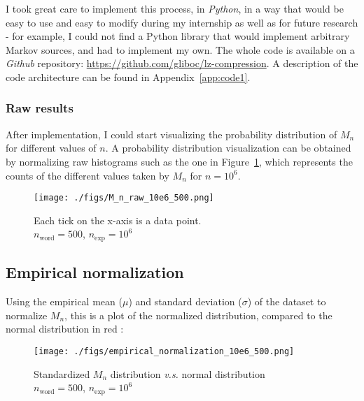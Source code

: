 	I took great care to implement this process, in \emph{Python}, 
	in a way that would be easy to use and easy to modify during my 
	internship as well as for future research - for example, I 
	could not find a Python library that would implement arbitrary Markov 
	sources, and had to implement my own.
	The whole code is available on a \emph{Github} repository:
	{\color{gray} \url{https://github.com/gliboc/lz-compression}}.
	A description of the code architecture can be found in Appendix~\ref{app:code1}.

	\subsubsection{ Raw results }
	
After implementation, I could start visualizing the probability
distribution of $M_n$ for different values of $n$. A probability 
distribution visualization can be obtained by normalizing raw 
histograms such as the one in Figure~\ref{fig:rawhisto}, which represents the counts of 
the different values taken by $M_n$ for $n=10^6$. 


 \begin{figure}[H]
	\centering
	   \texttt{[image: ./figs/M\_n\_raw\_10e6\_500.png]}	
		\caption{Each tick on the x-axis is a data point.\\
		$n_{\text{word}} = 500$, $n_{\text{exp}} = 10^6$}
		\label{fig:rawhisto}
   \end{figure}






	\subsection{Empirical normalization}


	Using the empirical mean ($\mu$) and standard deviation ($\sigma$) of the dataset to normalize $M_n$,
	this is a plot of the normalized distribution, compared to the normal distribution 
	in red :

  \begin{figure}[H]
		\centering
		\texttt{[image: ./figs/empirical\_normalization\_10e6\_500.png]}
		\centering
		\captionsetup{justification=centering,margin=2cm}
		\caption{Standardized $M_n$ distribution \textit{v.s.} normal distribution\\
					$n_{\text{word}} = 500$, $n_{\text{exp}} = 10^6$}
	\end{figure} 

